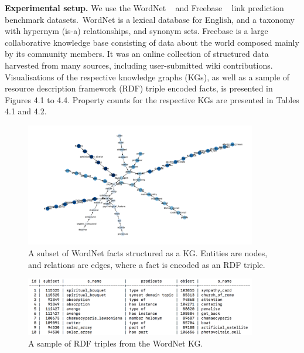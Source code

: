 \noindent \textbf{Experimental setup.} We use the WordNet \unskip ~\citep{miller1995wordnet} and Freebase \unskip ~\citep{bollacker2008freebase} link prediction benchmark datasets.\ WordNet is a lexical database for English, and a taxonomy with hypernym (is-a) relationships, and synonym sets. Freebase is a large collaborative knowledge base consisting of data about the world composed mainly by its community members. It was an online collection of structured data harvested from many sources, including user-submitted wiki contributions. Visualisations of the respective knowledge graphs (KGs), as well as a sample of resource description framework (RDF) triple encoded facts, is presented in Figures 4.1 to 4.4. Property counts for the respective KGs are presented in Tables 4.1 and 4.2. \par

\begin{figure}[H]
   	\centering
    	\includegraphics[width=0.9\textwidth, height=0.5\textwidth]{Wordnet}
	\captionsetup{justification=centering}
	\caption{A subset of WordNet facts structured as a KG. Entities are nodes, and relations are edges, where a fact is encoded as an RDF triple.}
\end{figure}

\begin{figure}[H]
   	\centering
    	\includegraphics[width=0.9\textwidth, height=0.3\textwidth]{wordnet_fact_sample}
	\captionsetup{justification=centering}
	\caption{A sample of RDF triples from the WordNet KG.}
\end{figure}

